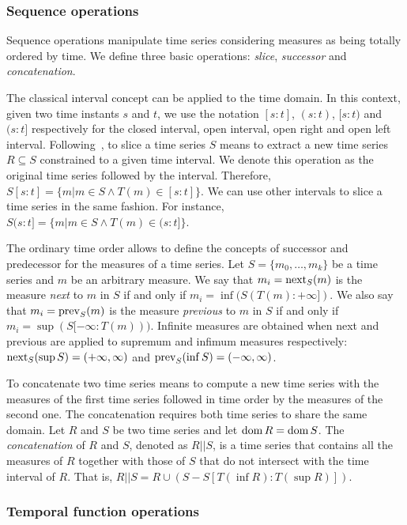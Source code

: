 \subsubsection{Sequence operations}
\label{sec:sequence}

Sequence operations manipulate time series considering measures as
being totally ordered by time.  We define three basic operations:
\emph{slice}, \emph{successor} and \emph{concatenation}.


The classical interval concept can be applied to the time domain. In this
context, given two time instants $s$ and $t$, we use the notation
$[s:t]$, $(s:t)$, $[s:t)$ and $(s:t]$ respectively for the closed
interval, open interval, open right and open left interval.
%
Following~\cite{last:hetland}, to slice a time series $S$ means to
extract a new time series $R\subseteq S$ constrained to a given time
interval. We denote this operation as the original time series followed
by the interval. Therefore, $S[s:t]=\{m|m\in S \wedge
T(m)\in[s:t]\}$. We can use other intervals to slice a time series in
the same fashion. For instance, $S(s:t]=\{m|m\in S \wedge
T(m)\in(s:t]\}$.

The ordinary time order allows to define the concepts of successor and
predecessor for the measures of a time series.
%
Let $S=\{m_0,\ldots,m_k\}$ be a time series and $m$ be an arbitrary
measure.
%
We say that $m_i=\operatorname*{next}_S(m)$ is the measure \emph{next} to $m$ in $S$
if and only if $m_i=\inf(S(T(m):+\infty])$.
%
We also say that $m_i=\operatorname*{prev}_S(m)$ is the measure \emph{previous} to
$m$ in $S$ if and only if $m_i=\sup(S[-\infty:T(m)))$.
%
Infinite measures are obtained when next and previous are applied to
supremum and infimum measures respectively: $\operatorname*{next}_S(\sup
S)=(+\infty,\infty)$ and $\operatorname*{prev}_S(\inf S)=(-\infty,\infty)$.

To concatenate two time series means to compute a new time series with
the measures of the first time series followed in time order by the
measures of the second one. 
%
The concatenation requires both time series to share the same domain.
Let $R$ and $S$ be two time series and let $\operatorname{dom} R=\operatorname{dom} S$. The
\emph{concatenation} of $R$ and $S$, denoted as $R||S$, is a time
series that contains all the measures of $R$ together with those of
$S$ that do not intersect with the time interval of $R$. That is,
$R||S= R\cup (S - S[T(\inf R):T(\sup R)])$.



\subsubsection{Temporal function operations}
\label{sec:model:tfunc}

